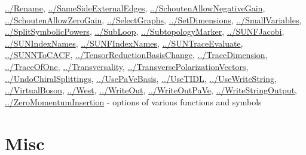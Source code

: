\documentclass[../FeynCalcManual.tex]{subfiles}
\begin{document}
\begin{itemize}
  \hyperlink{../rename}{../Rename},
  \hyperlink{../samesideexternaledges}{../SameSideExternalEdges},
  \hyperlink{../schoutenallownegativegain}{../SchoutenAllowNegativeGain},
  \hyperlink{../schoutenallowzerogain}{../SchoutenAllowZeroGain},
  \hyperlink{../selectgraphs}{../SelectGraphs},
  \hyperlink{../setdimensions}{../SetDimensions},
  \hyperlink{../smallvariables}{../SmallVariables},
  \hyperlink{../splitsymbolicpowers}{../SplitSymbolicPowers},
  \hyperlink{../subloop}{../SubLoop},
  \hyperlink{../subtopologymarker}{../SubtopologyMarker},
  \hyperlink{../sunfjacobi}{../SUNFJacobi},
  \hyperlink{../sunindexnames}{../SUNIndexNames},
  \hyperlink{../sunfindexnames}{../SUNFIndexNames},
  \hyperlink{../suntraceevaluate}{../SUNTraceEvaluate},
  \hyperlink{../sunntocacf}{../SUNNToCACF},
  \hyperlink{../tensorreductionbasischange}{../TensorReductionBasisChange},
  \hyperlink{../tracedimension}{../TraceDimension},
  \hyperlink{../traceofone}{../TraceOfOne},
  \hyperlink{../transversality}{../Transversality},
  \hyperlink{../transversepolarizationvectors}{../TransversePolarizationVectors},
  \hyperlink{../undochiralsplittings}{../UndoChiralSplittings},
  \hyperlink{../usepavebasis}{../UsePaVeBasis},
  \hyperlink{../usetidl}{../UseTIDL},
  \hyperlink{../usewritestring}{../UseWriteString},
  \hyperlink{../virtualboson}{../VirtualBoson},
  \hyperlink{../west}{../West}, \hyperlink{../writeout}{../WriteOut},
  \hyperlink{../writeoutpave}{../WriteOutPaVe},
  \hyperlink{../writestringoutput}{../WriteStringOutput},
  \hyperlink{../zeromomentuminsertion}{../ZeroMomentumInsertion} -
  options of various functions and symbols
\end{itemize}

\hypertarget{misc}{
\section{Misc}\label{misc}}
\end{document}
